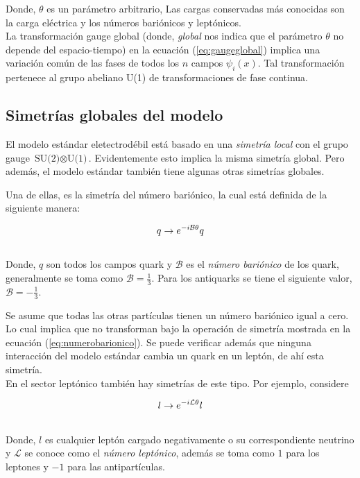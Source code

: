 \documentclass[12pt]{article}
\begin{document}
Donde, $\theta $ es un parámetro arbitrario,  Las cargas conservadas más conocidas son la carga eléctrica y los números bariónicos y leptónicos.\\  

La transformación gauge global (donde, \textit{global} nos indica que el parámetro $\theta$ no depende del espacio-tiempo) en la ecuación (\ref{eq:gaugeglobal}) implica una variación común de las fases de todos los $n$ campos $\psi_i(x)$. Tal transformación pertenece al grupo abeliano U(1) de transformaciones de fase continua. 

\subsection{Simetrías globales del modelo}

El modelo estándar eletectrodébil está basado en una \textit{simetría local } con el grupo gauge $\text{SU(2)} \otimes \text{U(1)}$. Evidentemente esto implica la misma simetría global. Pero además, el modelo estándar también tiene algunas otras simetrías globales.

Una de ellas, es la simetría del número bariónico, la cual está definida de la siguiente manera: 

\begin{equation}
\centering
q \rightarrow e^ {-i\mathcal{B}\theta}q
    \label{eq:numerobarionico}
\end{equation} \\ 
Donde, $q$ son todos los campos quark y $\mathcal{B}$ es el \textit{número bariónico} de los quark, generalmente se toma como $\mathcal{B}= \frac{1}{3}$. Para los antiquarks se tiene el siguiente valor, $\mathcal{B}= - \frac{1}{3}$.

Se asume que todas las otras partículas tienen un número bariónico igual a cero. Lo cual implica que no transforman bajo  la operación de simetría mostrada en la ecuación (\ref{eq:numerobarionico}). Se puede verificar además que ninguna interacción del modelo estándar cambia un quark en un leptón, de ahí esta simetría. \\ 

En el sector leptónico también hay simetrías de este tipo. Por ejemplo, considere 

\begin{equation}
\centering
l \rightarrow e^ {-i\mathcal{L}\theta}l
    \label{eq:numeroleptonico}
\end{equation} \\ 
Donde, $l$ es cualquier leptón cargado negativamente o su correspondiente neutrino y  $\mathcal{L}$ se conoce como el \textit{número leptónico}, además se toma como $1$ para los leptones y $-1 $ para las antipartículas.
\end{document}
